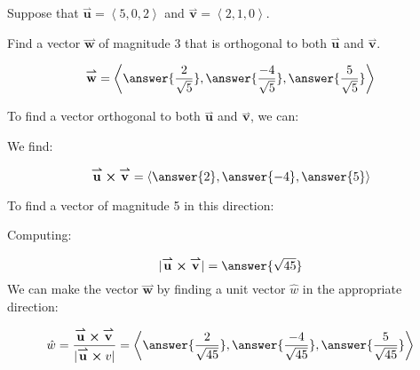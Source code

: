 \documentclass{ximera}
\author{Jim Talamo}
\begin{document}
\begin{exercise}
Suppose that $\overset{\boldsymbol{\rightharpoonup}}{\mathbf{u}} = \left< 5,0,2 \right>$ and $\overset{\boldsymbol{\rightharpoonup}}{\mathbf{v}} = \left< 2,1,0 \right>$.  

Find a vector $\overset{\boldsymbol{\rightharpoonup}}{\mathbf{w}}$ of magnitude 3 that is orthogonal to both $\overset{\boldsymbol{\rightharpoonup}}{\mathbf{u}}$ and $\overset{\boldsymbol{\rightharpoonup}}{\mathbf{v}}$.

\[
\overset{\boldsymbol{\rightharpoonup}}{\mathbf{w}} = \left< \answer{\frac{2}{\sqrt{5}}},\answer{\frac{-4}{\sqrt{5}}}, \answer{\frac{5}{\sqrt{5}}} \right>
\]


\begin{hint}
To find a vector orthogonal to both $\overset{\boldsymbol{\rightharpoonup}}{\mathbf{u}}$ and $\overset{\boldsymbol{\rightharpoonup}}{\mathbf{v}}$, we can:

\begin{multipleChoice}
\end{multipleChoice}

We find:

\[
\overset{\boldsymbol{\rightharpoonup}}{\mathbf{u}} \boldsymbol\times \overset{\boldsymbol{\rightharpoonup}}{\mathbf{v}} = \left< \answer{2},\answer{-4},\answer{5} \right>
\]

To find a vector of magnitude 5 in this direction:

\begin{multipleChoice}
\end{multipleChoice}

Computing:

\[
|\overset{\boldsymbol{\rightharpoonup}}{\mathbf{u}} \boldsymbol\times \overset{\boldsymbol{\rightharpoonup}}{\mathbf{v}} | = \answer{\sqrt{45}}
\]
We can make the vector $\overset{\boldsymbol{\rightharpoonup}}{\mathbf{w}}$ by finding a unit vector $\hat{w}$ in the appropriate direction:

\[
\hat{w} = \frac{\overset{\boldsymbol{\rightharpoonup}}{\mathbf{u}} \boldsymbol\times \overset{\boldsymbol{\rightharpoonup}}{\mathbf{v}}}{|\overset{\boldsymbol{\rightharpoonup}}{\mathbf{u}} \boldsymbol\times{v}|} = \left< \answer{\frac{2}{\sqrt{45}}},\answer{\frac{-4}{\sqrt{45}}}, \answer{\frac{5}{\sqrt{45}}} \right>
\]


\end{hint}
\end{exercise}
\end{document}

